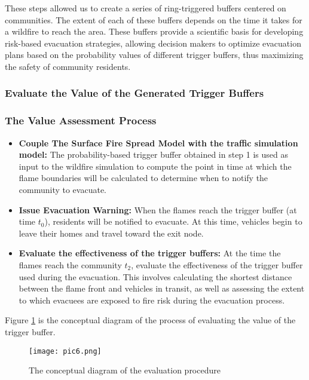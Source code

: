 \documentclass[12pt]{article}  %
\begin{document}
These steps allowed us to create a series of ring-triggered buffers centered on communities. The extent of each of these buffers depends on the time it takes for a wildfire to reach the area. These buffers provide a scientific basis for developing risk-based evacuation strategies, allowing decision makers to optimize evacuation plans based on the probability values of different trigger buffers, thus maximizing the safety of community residents.

\subsubsection{Evaluate the Value of the Generated Trigger Buffers}
\subsubsection*{The Value Assessment Process}
 \begin{itemize}
 	\setlength{\parsep}{0ex} 
 	\setlength{\topsep}{2ex} 
 	\setlength{\itemsep}{1ex} 
 	\item \textbf{Couple The Surface Fire Spread Model with the traffic simulation model:}  The probability-based trigger buffer obtained in step 1 is used as input to the wildfire simulation to compute the point in time at which the flame boundaries will be calculated to determine when to notify the community to evacuate.
 	
 	\item \textbf{Issue Evacuation Warning:} When the flames reach the trigger buffer (at time \( t_0 \)), residents will be notified to evacuate. At this time, vehicles begin to leave their homes and travel toward the exit node.
 	
 	\item \textbf{Evaluate the effectiveness of the trigger buffers:}  At the time the flames reach the community \( t_2 \), evaluate the effectiveness of the trigger buffer used during the evacuation. This involves calculating the shortest distance between the flame front and vehicles in transit, as well as assessing the extent to which evacuees are exposed to fire risk during the evacuation process.
 \end{itemize}
 
 Figure \ref{pic6} is the conceptual diagram of the process of evaluating the value of the trigger buffer.
 \begin{figure}[htbp]  
 	\centering  
 	\texttt{[image: pic6.png]} 
 	\caption{The conceptual diagram of the evaluation procedure} %
 	\label{pic6}
 \end{figure}
 \vspace{-0.5cm}
\end{document}

